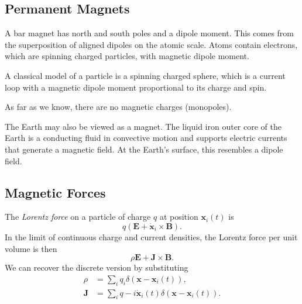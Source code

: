 \documentclass[12pt]{article}
\begin{document}

\subsection{Permanent Magnets}
\label{sub:permanent_magnets}

A bar magnet has north and south poles and a dipole moment. This comes from the superposition of aligned dipoles on the atomic scale. Atoms contain electrons, which are spinning charged particles, with magnetic dipole moment.

A classical model of a particle is a spinning charged sphere, which is a current loop with a magnetic dipole moment proportional to its charge and spin.

As far as we know, there are no magnetic charges (monopoles).

The Earth may also be viewed as a magnet. The liquid iron outer core of the Earth is a conducting fluid in convective motion and supports electric currents that generate a magnetic field. At the Earth's surface, this resembles a dipole field.

\subsection{Magnetic Forces}
\label{sub:magnetic_forces}

The \emph{Lorentz force} on a particle of charge $q$ at position $\mathbf{x}_i(t)$ is
\[
q(\mathbf{E} + \mathbf{\dot x}_i \times \mathbf{B})
.\]
In the limit of continuous charge and current densities, the Lorentz force per unit volume is then
\[
\rho \mathbf{E} + \mathbf{J} \times \mathbf{B}
.\]
We can recover the discrete version by substituting
\begin{align*}
	\rho &= \sum_{i} q_i \delta(\mathbf{x} - \mathbf{x}_i(t)), \\
	\mathbf{J} &= \sum_{i} q-i \mathbf{\dot x}_i (t) \delta(\mathbf{x} - \mathbf{x}_i(t)).
\end{align*}
\end{document}
